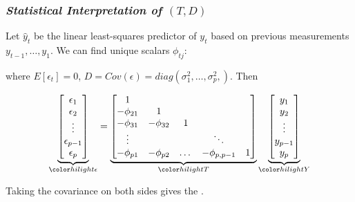 \begin{frame}
\frametitle{\emph{Statistical Interpretation of $\left(T,D\right)$}}{}
Let $\hat{y}_t$ be the linear least-squares predictor of $y_t$ based on previous measurements $y_{t-1}, \dots , y_1$. We can find unique scalars $\phi_{tj}$:


where $E\left[\epsilon_t\right] = 0$, $D = Cov\left( \epsilon \right) = diag\left( \sigma_1^2,\dots,\sigma_p^2, \right)$. Then

\begin{align*}
\underbrace{\begin{bmatrix}
\epsilon_1 \\
\epsilon_2 \\ \vdots \\\epsilon_{p-1} \\ \epsilon_p
\end{bmatrix}}_{\nt{\epsilon}} = \underbrace{\begin{bmatrix}
1&&&&\\
-\phi_{21}&1&&&\\
-\phi_{31}&-\phi_{32}&1&&\\
\vdots &&&\ddots& \\
-\phi_{p1}&-\phi_{p2}& \dots & -\phi_{p,p-1}&1\\
\end{bmatrix}}_{\nt{T}}
\underbrace{\begin{bmatrix}
y_1 \\
y_2 \\ \vdots \\ y_{p-1}\\y_p
\end{bmatrix}}_{\nt{Y}}
\end{align*}

Taking the covariance on both sides gives the .
\end{frame}







